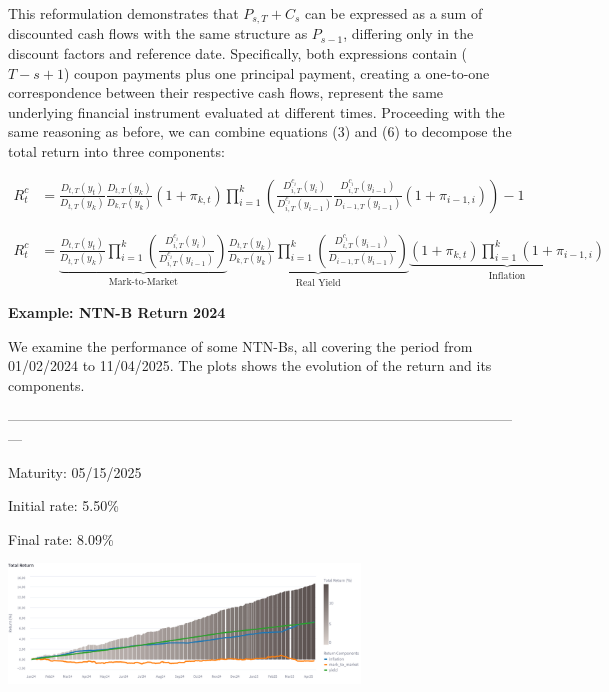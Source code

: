 \documentclass[10pt]{report}
\begin{document}
This reformulation demonstrates that $P_{s,T} + C_s$ can be expressed as a sum of discounted cash flows with the same structure as $P_{s-1}$, differing only in the discount factors and reference date. Specifically, both expressions contain ($T-s+1$) coupon payments plus one principal payment, creating a one-to-one correspondence between their respective cash flows, represent the same underlying financial instrument evaluated at different times. Proceeding with the same reasoning as before, we can combine equations (3) and (6) to decompose the total return into three components:

\begin{align*}
	R_{t}^{c} & = \frac{D_{t,T}(y_{t})}{D_{t,T}(y_{k})}  \frac{D_{t,T}(y_{k})}{D_{k,T}(y_{k})}  \left(1 + \pi_{k,t}\right)  \prod_{i=1}^{k}\left( \frac{D_{i,T}^{c_i}(y_{i})}{D_{i,T}^{c_i}(y_{i-1})}  \frac{D_{i,T}^{c_i}(y_{i-1})}{D_{i-1,T}(y_{i-1})}  \left(1 + \pi_{i-1,i}\right)\right) - 1
\end{align*}

\begin{align*}
	R_{t}^{c} & = \underbrace{\frac{D_{t,T}(y_{t})}{D_{t,T}(y_{k})}\prod_{i=1}^{k}\left( \frac{D_{i,T}^{c_i}(y_{i})}{D_{i,T}^{c_i}(y_{i-1})} \right)}_{\text{Mark-to-Market}} \underbrace{\frac{D_{t,T}(y_{k})}{D_{k,T}(y_{k})}\prod_{i=1}^{k}\left( \frac{D_{i,T}^{c_i}(y_{i-1})}{D_{i-1,T}(y_{i-1})} \right)}_{\text{Real Yield}} \underbrace{\left(1 + \pi_{k,t}\right) \prod_{i=1}^{k}\left(1 + \pi_{i-1,i}\right)}_{\text{Inflation}}
\end{align*}

\textbf{Example: NTN-B Return 2024}
\vspace{0.5cm}

We examine the performance of some NTN-Bs, all covering the period from 01/02/2024 to 11/04/2025. The plots shows the evolution of the return and its components.
\vspace{0.25cm}

---------------------------------------------------------------------------------------------------------------

Maturity: 05/15/2025

Initial rate: 5.50\%

Final rate: 8.09\%
\vspace{0.25cm}
\begin{center}
	\includegraphics[width=0.7\textwidth]{img/return_B25.png}
\end{center}
\end{document}
